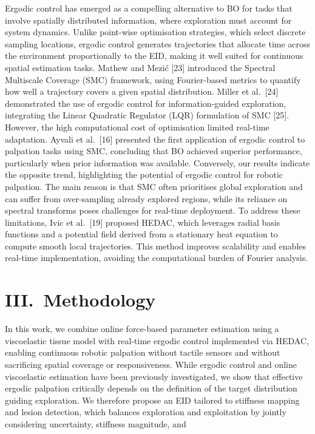 \documentclass[11pt]{article}
\begin{document}
Ergodic control has emerged as a compelling alternative to BO for
tasks that involve spatially distributed information, where
exploration must account for system dynamics. Unlike point-wise
optimisation strategies, which select discrete sampling locations,
ergodic control generates trajectories that allocate time across the
environment proportionally to the EID, making it well suited for
continuous spatial estimation tasks. Mathew and Mezi\'c [23]
introduced the Spectral Multiscale Coverage (SMC) framework, using
Fourier-based metrics to quantify how well a trajectory covers a
given spatial distribution. Miller et al.\ [24] demonstrated the use
of ergodic control for information-guided exploration, integrating
the Linear Quadratic Regulator (LQR) formulation of SMC [25].
However, the high computational cost of optimisation limited
real-time adaptation. Ayvali et al.\ [16] presented the first
application of ergodic control to palpation tasks using SMC,
concluding that BO achieved superior performance, particularly when
prior information was available. Conversely, our results indicate
the opposite trend, highlighting the potential of ergodic control
for robotic palpation. The main reason is that SMC often prioritises
global exploration and can suffer from over-sampling already explored
regions, while its reliance on spectral transforms poses challenges
for real-time deployment. To address these limitations, Ivic et al.\
[19] proposed HEDAC, which leverages radial basis functions and a
potential field derived from a stationary heat equation to compute
smooth local trajectories. This method improves scalability and
enables real-time implementation, avoiding the computational burden
of Fourier analysis.

\section*{III.\ Methodology}

In this work, we combine online force-based parameter estimation
using a viscoelastic tissue model with real-time ergodic control
implemented via HEDAC, enabling continuous robotic palpation without
tactile sensors and without sacrificing spatial coverage or
responsiveness. While ergodic control and online viscoelastic
estimation have been previously investigated, we show that effective
ergodic palpation critically depends on the definition of the target
distribution guiding exploration. We therefore propose an EID
tailored to stiffness mapping and lesion detection, which balances
exploration and exploitation by jointly considering uncertainty,
stiffness magnitude, and
\end{document}
